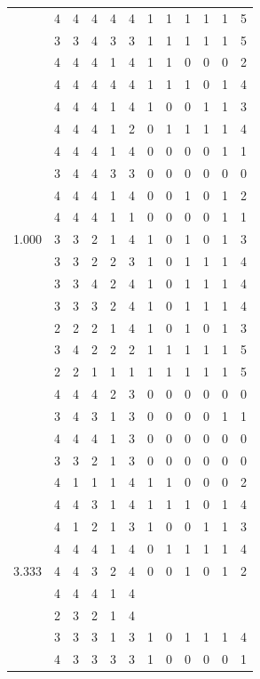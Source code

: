 \documentclass[]{book}
\theoremstyle{definition}
\theoremstyle{definition}
\theoremstyle{definition}
\theoremstyle{remark}
\begin{document}
\begin{table}
{\begin{tabular}[t]{rrrrrrrrrrrr}
 & 4 & 4 & 4 & 4 & 4 & 1 & 1 & 1 & 1 & 1 & 5\\
 & 3 & 3 & 4 & 3 & 3 & 1 & 1 & 1 & 1 & 1 & 5\\
 & 4 & 4 & 4 & 1 & 4 & 1 & 1 & 0 & 0 & 0 & 2\\
 & 4 & 4 & 4 & 4 & 4 & 1 & 1 & 1 & 0 & 1 & 4\\
 & 4 & 4 & 4 & 1 & 4 & 1 & 0 & 0 & 1 & 1 & 3\\
 & 4 & 4 & 4 & 1 & 2 & 0 & 1 & 1 & 1 & 1 & 4\\
 & 4 & 4 & 4 & 1 & 4 & 0 & 0 & 0 & 0 & 1 & 1\\
 & 3 & 4 & 4 & 3 & 3 & 0 & 0 & 0 & 0 & 0 & 0\\
 & 4 & 4 & 4 & 1 & 4 & 0 & 0 & 1 & 0 & 1 & 2\\
 & 4 & 4 & 4 & 1 & 1 & 0 & 0 & 0 & 0 & 1 & 1\\
1.000 & 3 & 3 & 2 & 1 & 4 & 1 & 0 & 1 & 0 & 1 & 3\\
 & 3 & 3 & 2 & 2 & 3 & 1 & 0 & 1 & 1 & 1 & 4\\
 & 3 & 3 & 4 & 2 & 4 & 1 & 0 & 1 & 1 & 1 & 4\\
 & 3 & 3 & 3 & 2 & 4 & 1 & 0 & 1 & 1 & 1 & 4\\
 & 2 & 2 & 2 & 1 & 4 & 1 & 0 & 1 & 0 & 1 & 3\\
 & 3 & 4 & 2 & 2 & 2 & 1 & 1 & 1 & 1 & 1 & 5\\
 & 2 & 2 & 1 & 1 & 1 & 1 & 1 & 1 & 1 & 1 & 5\\
 & 4 & 4 & 4 & 2 & 3 & 0 & 0 & 0 & 0 & 0 & 0\\
 & 3 & 4 & 3 & 1 & 3 & 0 & 0 & 0 & 0 & 1 & 1\\
 & 4 & 4 & 4 & 1 & 3 & 0 & 0 & 0 & 0 & 0 & 0\\
 & 3 & 3 & 2 & 1 & 3 & 0 & 0 & 0 & 0 & 0 & 0\\
 & 4 & 1 & 1 & 1 & 4 & 1 & 1 & 0 & 0 & 0 & 2\\
 & 4 & 4 & 3 & 1 & 4 & 1 & 1 & 1 & 0 & 1 & 4\\
 & 4 & 1 & 2 & 1 & 3 & 1 & 0 & 0 & 1 & 1 & 3\\
 & 4 & 4 & 4 & 1 & 4 & 0 & 1 & 1 & 1 & 1 & 4\\
3.333 & 4 & 4 & 3 & 2 & 4 & 0 & 0 & 1 & 0 & 1 & 2\\
 & 4 & 4 & 4 & 1 & 4 &  &  &  &  &  & \\
 & 2 & 3 & 2 & 1 & 4 &  &  &  &  &  & \\
 & 3 & 3 & 3 & 1 & 3 & 1 & 0 & 1 & 1 & 1 & 4\\
 & 4 & 3 & 3 & 3 & 3 & 1 & 0 & 0 & 0 & 0 & 1\\

\end{tabular}}
\end{table}
\end{document}
